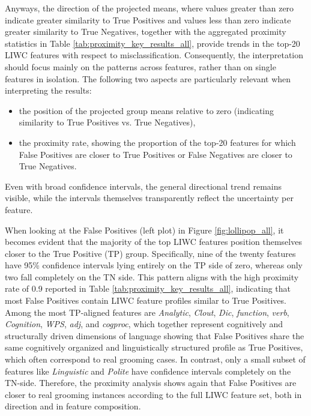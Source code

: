 Anyways, the direction of the projected means, where values greater than zero indicate greater similarity to True Positives and values less than zero indicate greater similarity to True Negatives, together with the aggregated proximity statistics in Table \ref{tab:proximity_key_results_all}, provide trends in the top-20 LIWC features with respect to misclassification. Consequently, the interpretation should focus mainly on the patterns across features, rather than on single features in isolation.
The following two aspects are particularly relevant when interpreting the results:
\begin{itemize}
\item the position of the projected group means relative to zero (indicating similarity to True Positives vs. True Negatives),
\item the proximity rate, showing the proportion of the top-20 features for which False Positives are closer to True Positives or False Negatives are closer to True Negatives.
\end{itemize}

Even with broad confidence intervals, the general directional trend remains visible, while the intervals themselves transparently reflect the uncertainty per feature.

When looking at the False Positives (left plot) in Figure \ref{fig:lollipop_all}, it becomes evident that the majority of the top LIWC features position themselves closer to the True Positive (TP) group. Specifically, nine of the twenty features have 95\% confidence intervals lying entirely on the TP side of zero, whereas only two fall completely on the TN side. This pattern aligns with the high proximity rate of 0.9 reported in Table \ref{tab:proximity_key_results_all}, indicating that most False Positives contain LIWC feature profiles similar to True Positives. Among the most TP-aligned features are \textit{Analytic}, \textit{Clout}, \textit{Dic}, \textit{function}, \textit{verb}, \textit{Cognition}, \textit{WPS}, \textit{adj}, and \textit{cogproc}, which together represent cognitively and structurally driven dimensions of language showing that False Positives share the same cognitively organized and linguistically structured profile as True Positives, which often correspond to real grooming cases. In contrast, only a small subset of features like \textit{Linguistic} and \textit{Polite} have confidence intervals completely on the TN-side. Therefore, the proximity analysis shows again that False Positives are closer to real grooming instances according to the full LIWC feature set, both in direction and in feature composition.

